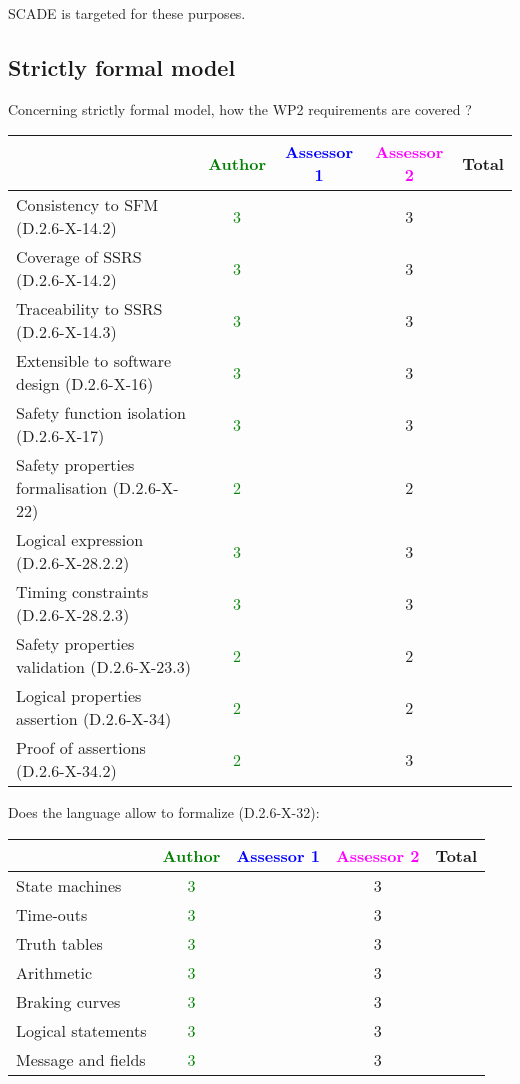 \begin{author_comment}
SCADE is targeted for these purposes.   
\end{author_comment}


\subsection{Strictly formal model}

Concerning strictly formal model, how the WP2 requirements are covered ?

\begin{tabular}{|l | c | c | c | c|}
\hline
& \textcolor{green}{Author} & \textcolor{blue}{Assessor 1} & \textcolor{magenta}{Assessor 2} & Total \\
\hline 
Consistency to SFM (D.2.6-X-14.2) & \textcolor{green}{3} & &3 &  \\
\hline
Coverage of SSRS (D.2.6-X-14.2)  &\textcolor{green}{3} & &3 &  \\
\hline
Traceability to  SSRS (D.2.6-X-14.3)  &\textcolor{green}{3} & &3 &  \\
\hline
Extensible to software design (D.2.6-X-16)  &\textcolor{green}{3} & &3 &  \\
\hline
Safety function isolation (D.2.6-X-17)  &  \textcolor{green}{3}& &3 &  \\
\hline 
Safety properties formalisation (D.2.6-X-22)  &  \textcolor{green}{2}& &2 &  \\
\hline
Logical expression (D.2.6-X-28.2.2)  &  \textcolor{green}{3}& &3 &  \\
\hline
Timing constraints (D.2.6-X-28.2.3)  &  \textcolor{green}{3}& &3 &  \\
\hline
Safety properties validation (D.2.6-X-23.3)  &  \textcolor{green}{2}& &2 &  \\
\hline
Logical properties assertion (D.2.6-X-34)  &  \textcolor{green}{2}& &2 &  \\
\hline
Proof of assertions (D.2.6-X-34.2)  &  \textcolor{green}{2} & &3 &  \\
\hline
\end{tabular}

Does the language allow to  formalize (D.2.6-X-32):

\begin{tabular}{|l | c | c | c | c|}
\hline
& \textcolor{green}{Author} & \textcolor{blue}{Assessor 1} & \textcolor{magenta}{Assessor 2} & Total \\
\hline 
State machines  & \textcolor{green}{3} & &3 &  \\
\hline
Time-outs  & \textcolor{green}{3} & &3 &  \\
\hline
Truth tables  & \textcolor{green}{3} & &3 &  \\
\hline
Arithmetic  & \textcolor{green}{3}& &3 &  \\
\hline
Braking curves  & \textcolor{green}{3}& &3 &  \\
\hline
Logical statements & \textcolor{green}{3}& &3 &  \\
\hline
Message and fields &\textcolor{green}{3} & &3 &  \\
\hline
\end{tabular}

